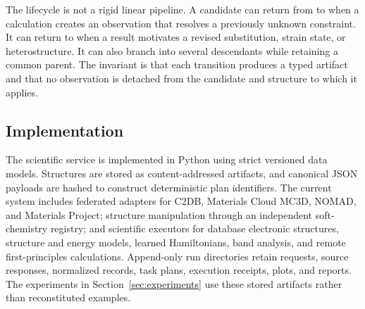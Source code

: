 The lifecycle is not a rigid linear pipeline.  A candidate can return from \matdag to \matevidence when a calculation creates an observation that resolves a previously unknown constraint.  It can return to \mattransform when a result motivates a revised substitution, strain state, or heterostructure.  It can also branch into several descendants while retaining a common parent.  The invariant is that each transition produces a typed artifact and that no observation is detached from the candidate and structure to which it applies.

\subsection{Implementation}

The scientific service is implemented in Python using strict versioned data models.  Structures are stored as content-addressed artifacts, and canonical JSON payloads are hashed to construct deterministic plan identifiers.  The current system includes federated adapters for C2DB, Materials Cloud MC3D, NOMAD, and Materials Project; structure manipulation through an independent soft-chemistry registry; and scientific executors for database electronic structures, structure and energy models, learned Hamiltonians, band analysis, and remote first-principles calculations.  Append-only run directories retain requests, source responses, normalized records, task plans, execution receipts, plots, and reports.  The experiments in Section~\ref{sec:experiments} use these stored artifacts rather than reconstituted examples.
